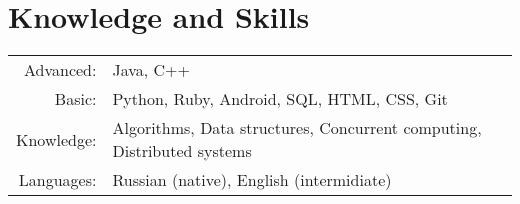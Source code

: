 \documentclass[a4paper,12pt]{article}
\begin{document}
\section{Knowledge and Skills}
\begin{tabular}{rl}
Advanced:& Java, C++\\
Basic:& Python, Ruby, Android, SQL, HTML, CSS, Git\\
Knowledge:& Algorithms, Data structures, Concurrent computing, Distributed systems\\
Languages:& Russian (native), English (intermidiate)
\end{tabular}


\end{document}
